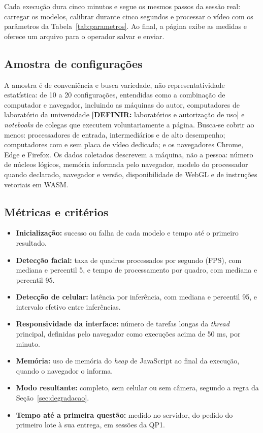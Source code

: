 \documentclass[portuguese,oneside]{tcc}
\newcommand{\estr}[1]{\emph{#1}}
\newcommand{\definir}[1]{\textcolor{orange!75!black}{\textbf{[DEFINIR:} #1\textbf{]}}}
\begin{document}
Cada execução dura cinco minutos e segue os mesmos passos da sessão real: carregar os modelos, calibrar durante cinco segundos e processar o vídeo com os parâmetros da Tabela~\ref{tab:parametros}. Ao final, a página exibe as medidas e oferece um arquivo para o operador salvar e enviar.

\subsection{Amostra de configurações}

A amostra é de conveniência e busca variedade, não representatividade estatística: de 10 a 20 configurações, entendidas como a combinação de computador e navegador, incluindo as máquinas do autor, computadores de laboratório da universidade \definir{laboratórios e autorização de uso} e \estr{notebooks} de colegas que executem voluntariamente a página. Busca-se cobrir ao menos: processadores de entrada, intermediários e de alto desempenho; computadores com e sem placa de vídeo dedicada; e os navegadores Chrome, Edge e Firefox. Os dados coletados descrevem a máquina, não a pessoa: número de núcleos lógicos, memória informada pelo navegador, modelo do processador quando declarado, navegador e versão, disponibilidade de WebGL e de instruções vetoriais em WASM.

\subsection{Métricas e critérios}

\begin{itemize}
  \item \textbf{Inicialização:} sucesso ou falha de cada modelo e tempo até o primeiro resultado.
  \item \textbf{Detecção facial:} taxa de quadros processados por segundo (FPS), com mediana e percentil 5, e tempo de processamento por quadro, com mediana e percentil 95.
  \item \textbf{Detecção de celular:} latência por inferência, com mediana e percentil 95, e intervalo efetivo entre inferências.
  \item \textbf{Responsividade da interface:} número de tarefas longas da \estr{thread} principal, definidas pelo navegador como execuções acima de 50 ms, por minuto.
  \item \textbf{Memória:} uso de memória do \estr{heap} de JavaScript ao final da execução, quando o navegador o informa.
  \item \textbf{Modo resultante:} completo, sem celular ou sem câmera, segundo a regra da Seção~\ref{sec:degradacao}.
  \item \textbf{Tempo até a primeira questão:} medido no servidor, do pedido do primeiro lote à sua entrega, em sessões da QP1.
\end{itemize}
\end{document}
